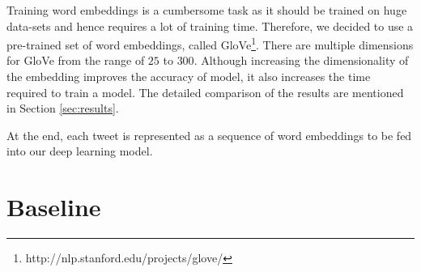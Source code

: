 \documentclass[8pt,conference,compsocconf]{IEEEtran}
\begin{document}
Training word embeddings is a cumbersome task as it should be trained on huge data-sets and hence requires a lot of training time. Therefore, we decided to use a pre-trained set of word embeddings, called GloVe\footnote{http://nlp.stanford.edu/projects/glove/}. There are multiple dimensions for GloVe from the range of $25$ to $300$. Although increasing the dimensionality of the embedding improves the accuracy of model, it also increases the time required to train a model.
The detailed comparison of the results are mentioned in Section \ref{sec:results}.

At the end, each tweet is represented as a sequence of word embeddings to be fed into our deep learning model.

\section{Baseline} \label{sec:baseline}
\end{document}

